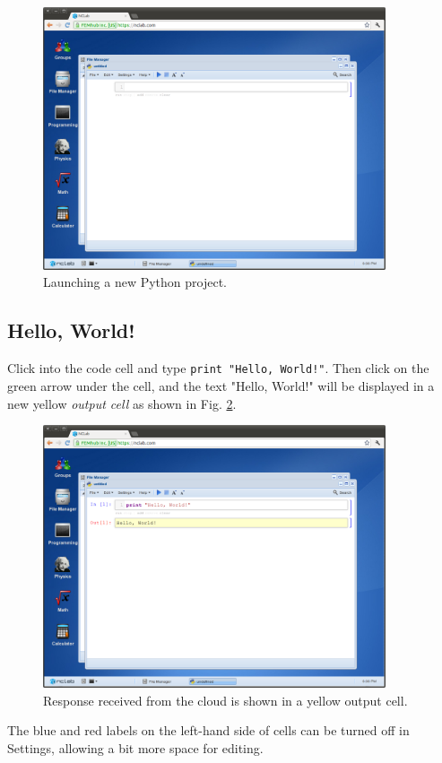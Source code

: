 \documentclass[article,A4,12pt]{llncs}
\begin{document}
\begin{figure}[!ht]
\begin{center}
\includegraphics[width=0.9\textwidth]{img/python.png}
\end{center}
\vspace{-2mm}
\caption{Launching a new Python project.}
\label{fig:python}
\end{figure}


\subsection{Hello, World!}

Click into the code cell and type {\tt print "Hello, World!"}.
Then click on the green arrow under the cell, and the text 
"Hello, World!" will be displayed 
in a new yellow {\em output cell} as shown in Fig. \ref{fig:python-2}.
\newpage
\begin{figure}[!ht]
\begin{center}
\includegraphics[width=0.9\textwidth]{img/python-2.png}
\end{center}
\vspace{-2mm}
\caption{Response received from the cloud is shown in a yellow output cell.}
\label{fig:python-2}
\end{figure}
\noindent
The blue and red labels on the left-hand side of cells can be turned
off in Settings, allowing a bit more space for editing.
\end{document}
